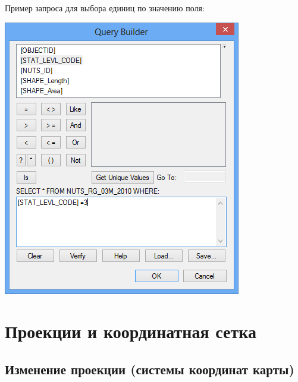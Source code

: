 \documentclass[12pt,]{book}
\begin{document}
Пример запроса для выбора единиц по значению поля:

\includegraphics{images/Appendix/image73.png}

\hypertarget{manual-projections}{%
\chapter{Проекции и координатная сетка}\label{manual-projections}}

\hypertarget{manual-projections-change}{%
\section{Изменение проекции (системы координат карты)}\label{manual-projections-change}}
\end{document}
